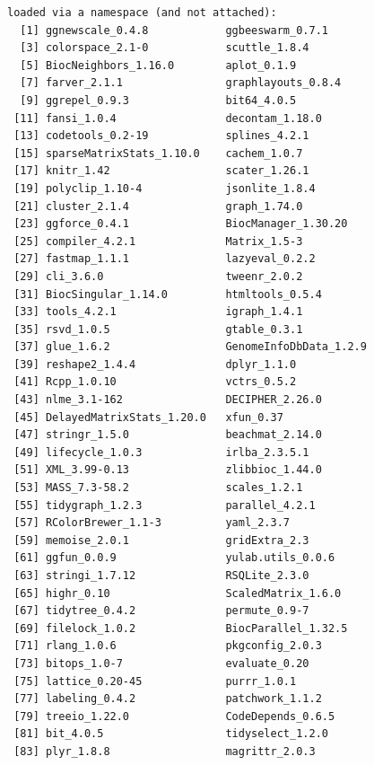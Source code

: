 \documentclass[
]{book}
\begin{document}
\begin{verbatim}
loaded via a namespace (and not attached):
  [1] ggnewscale_0.4.8            ggbeeswarm_0.7.1           
  [3] colorspace_2.1-0            scuttle_1.8.4              
  [5] BiocNeighbors_1.16.0        aplot_0.1.9                
  [7] farver_2.1.1                graphlayouts_0.8.4         
  [9] ggrepel_0.9.3               bit64_4.0.5                
 [11] fansi_1.0.4                 decontam_1.18.0            
 [13] codetools_0.2-19            splines_4.2.1              
 [15] sparseMatrixStats_1.10.0    cachem_1.0.7               
 [17] knitr_1.42                  scater_1.26.1              
 [19] polyclip_1.10-4             jsonlite_1.8.4             
 [21] cluster_2.1.4               graph_1.74.0               
 [23] ggforce_0.4.1               BiocManager_1.30.20        
 [25] compiler_4.2.1              Matrix_1.5-3               
 [27] fastmap_1.1.1               lazyeval_0.2.2             
 [29] cli_3.6.0                   tweenr_2.0.2               
 [31] BiocSingular_1.14.0         htmltools_0.5.4            
 [33] tools_4.2.1                 igraph_1.4.1               
 [35] rsvd_1.0.5                  gtable_0.3.1               
 [37] glue_1.6.2                  GenomeInfoDbData_1.2.9     
 [39] reshape2_1.4.4              dplyr_1.1.0                
 [41] Rcpp_1.0.10                 vctrs_0.5.2                
 [43] nlme_3.1-162                DECIPHER_2.26.0            
 [45] DelayedMatrixStats_1.20.0   xfun_0.37                  
 [47] stringr_1.5.0               beachmat_2.14.0            
 [49] lifecycle_1.0.3             irlba_2.3.5.1              
 [51] XML_3.99-0.13               zlibbioc_1.44.0            
 [53] MASS_7.3-58.2               scales_1.2.1               
 [55] tidygraph_1.2.3             parallel_4.2.1             
 [57] RColorBrewer_1.1-3          yaml_2.3.7                 
 [59] memoise_2.0.1               gridExtra_2.3              
 [61] ggfun_0.0.9                 yulab.utils_0.0.6          
 [63] stringi_1.7.12              RSQLite_2.3.0              
 [65] highr_0.10                  ScaledMatrix_1.6.0         
 [67] tidytree_0.4.2              permute_0.9-7              
 [69] filelock_1.0.2              BiocParallel_1.32.5        
 [71] rlang_1.0.6                 pkgconfig_2.0.3            
 [73] bitops_1.0-7                evaluate_0.20              
 [75] lattice_0.20-45             purrr_1.0.1                
 [77] labeling_0.4.2              patchwork_1.1.2            
 [79] treeio_1.22.0               CodeDepends_0.6.5          
 [81] bit_4.0.5                   tidyselect_1.2.0           
 [83] plyr_1.8.8                  magrittr_2.0.3             

\end{verbatim}
\end{document}
